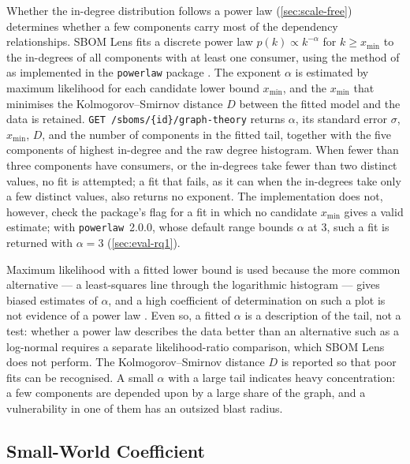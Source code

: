 Whether the in-degree distribution follows a power law (\autoref{sec:scale-free}) determines whether a few components carry most of the dependency relationships. SBOM Lens fits a discrete power law \(p(k) \propto k^{-\alpha}\) for \(k \geq x_{\min}\) to the in-degrees of all components with at least one consumer, using the method of \citet{Clauset2009} as implemented in the \texttt{powerlaw} package \citep{Alstott2014}. The exponent \(\alpha\) is estimated by maximum likelihood for each candidate lower bound \(x_{\min}\), and the \(x_{\min}\) that minimises the Kolmogorov--Smirnov distance \(D\) between the fitted model and the data is retained. \texttt{GET /sboms/\{id\}/graph-theory} returns \(\alpha\), its standard error \(\sigma\), \(x_{\min}\), \(D\), and the number of components in the fitted tail, together with the five components of highest in-degree and the raw degree histogram. When fewer than three components have consumers, or the in-degrees take fewer than two distinct values, no fit is attempted; a fit that fails, as it can when the in-degrees take only a few distinct values, also returns no exponent. The implementation does not, however, check the package's flag for a fit in which no candidate \(x_{\min}\) gives a valid estimate; with \texttt{powerlaw}~2.0.0, whose default range bounds \(\alpha\) at 3, such a fit is returned with \(\alpha = 3\) (\autoref{sec:eval-rq1}).

Maximum likelihood with a fitted lower bound is used because the more common alternative --- a least-squares line through the logarithmic histogram --- gives biased estimates of \(\alpha\), and a high coefficient of determination on such a plot is not evidence of a power law \citep{Clauset2009}. Even so, a fitted \(\alpha\) is a description of the tail, not a test: whether a power law describes the data better than an alternative such as a log-normal requires a separate likelihood-ratio comparison, which SBOM Lens does not perform. The Kolmogorov--Smirnov distance \(D\) is reported so that poor fits can be recognised. A small \(\alpha\) with a large tail indicates heavy concentration: a few components are depended upon by a large share of the graph, and a vulnerability in one of them has an outsized blast radius.


\subsection{Small-World Coefficient}
\label{sec:ns-small-world}

